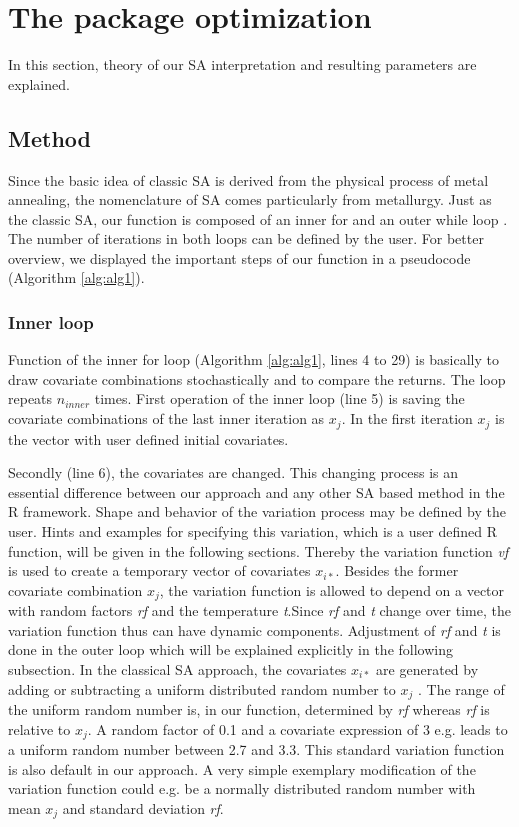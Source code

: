 \section{The package optimization}
In this section, theory of our SA interpretation and resulting parameters are explained.

\subsection{Method}
\label{subsec:method}
Since the basic idea of classic SA is derived from the physical process of metal annealing, the nomenclature of SA comes particularly from metallurgy. Just as the classic SA, our function is composed of an inner for and an outer while loop \citep{kirkpatrick_1983}. The number of iterations in both loops can be defined by the user. For better overview, we displayed the important steps of our function in a pseudocode (Algorithm \ref{alg:alg1}).

\subsubsection{Inner loop}
Function of the inner for loop (Algorithm \ref{alg:alg1}, lines 4 to 29) is basically to draw covariate combinations stochastically and to compare the returns. The loop repeats $n_{inner}$ times. First operation of the inner loop (line 5) is saving the covariate combinations of the last inner iteration as $x_j$. In the first iteration $x_j$ is the vector with user defined initial covariates.

Secondly (line 6), the covariates are changed. This changing process is an essential difference between our approach and any other SA based method in the R framework. Shape and behavior of the variation process may be defined by the user. Hints and examples for specifying this variation, which is a user defined R function, will be given in the following sections. Thereby the variation function \textit{vf} is used to create a temporary vector of covariates $x_{i*}$. Besides the former covariate combination $x_j$, the variation function is allowed to depend on a vector with random factors \textit{rf} and the temperature \textit{t}.Since \textit{rf} and \textit{t} change over time, the variation function thus can have dynamic components. Adjustment of \textit{rf} and \textit{t} is done in the outer loop which will be explained explicitly in the following subsection. In the classical SA approach, the covariates $x_{i*}$ are generated by adding or subtracting a uniform distributed random number to $x_j$ \citep{kirkpatrick_1983}. The range of the uniform random number is, in our function, determined by \textit{rf} whereas \textit{rf} is relative to $x_j$. A random factor of 0.1 and a covariate expression of 3 e.g. leads to a uniform random number between 2.7 and 3.3. This standard variation function is also default in our approach. A very simple exemplary modification of the variation function could e.g. be a normally distributed random number with mean $x_j$ and standard deviation \textit{rf}.

